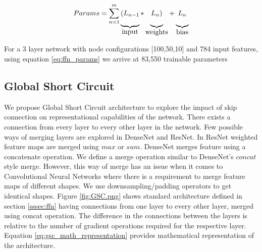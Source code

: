 \usepackage{}\documentclass{article}
\begin{document}
\begin{equation}
\label{eq:ffn_params}
Params= \sum_{n=1}^{m}
\underbrace{(L_{n-1}\rule[-12pt]{0pt}{5pt}}_{\mbox{input}}
*\underbrace{L_{n})\rule[-12pt]{0pt}{5pt}}_{\mbox{weights}}
+\underbrace{L_{n}\rule[-12pt]{0pt}{5pt}}_{\mbox{bias}}
\end{equation}

For a 3 layer network with node configurations [100,50,10] and 784 input features, using equation \ref{eq:ffn_params} we arrive at 83,550 trainable parameters


\subsection{Global Short Circuit}
We propose Global Short Circuit architecture to explore the impact of skip connection on representational capabilities of the network. There exists a connection from every layer to every other layer in the network. Few possible ways of merging layers are explored in DenseNet\cite{Li2018DenselyCC} and ResNet\cite{He2016DeepRL}. In ResNet weighted feature maps are merged using $max$ or $sum$. DenseNet merges feature using a concatenate operation. We define a merge operation similar to DenseNet's $concat$ style merge. However, this way of merge has an issue when it comes to Convolutional Neural Networks where there is a requirement to merge feature maps of different shapes. We use downsampling/padding operators to get identical shapes. Figure \ref{fig:GSC.png} shows standard architecture defined in section \ref{sssec:ffn} having connections from one layer to every other layer, merged using concat operation. The difference in the connections between the layers is relative to the number of gradient operations required for the respective layer. Equation \ref{eq:gsc_math_representation} provides mathematical representation of the architecture.
\end{document}
